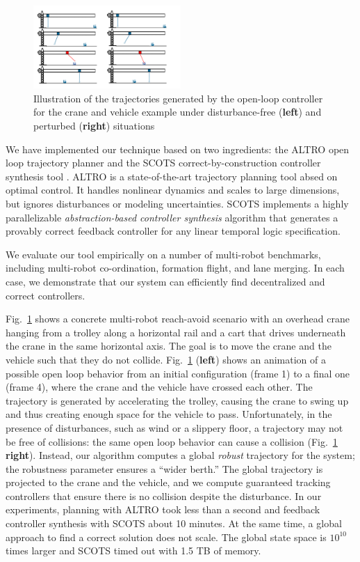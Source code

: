 \begin{figure}[t]
	\centering
	\includegraphics[width=0.5\textwidth]{figures/crane_and_forklifter.pdf}
	\caption{Illustration of the trajectories generated by the open-loop controller for the crane and vehicle example under disturbance-free (\textbf{left}) and perturbed (\textbf{right}) situations} 
	\label{fig:cr_and_lft}
\end{figure}




We have implemented our technique based on two ingredients: the ALTRO open loop trajectory planner \cite{howell2019altro} and the 
SCOTS correct-by-construction controller synthesis tool \cite{SCOTS}. 
ALTRO is a state-of-the-art trajectory planning tool absed on optimal control.
It handles nonlinear dynamics and scales to large dimensions, but ignores disturbances or modeling uncertainties.
SCOTS implements a highly parallelizable \emph{abstraction-based controller synthesis} algorithm that generates a provably
correct feedback controller for any linear temporal logic specification.

We evaluate our tool empirically on a number of multi-robot benchmarks, including multi-robot co-ordination,
formation flight, and lane merging.
In each case, we demonstrate that our system can efficiently find decentralized and correct controllers.

Fig.~\ref{fig:cr_and_lft} shows a concrete multi-robot reach-avoid scenario with an overhead crane hanging from a trolley along a horizontal rail
and a cart that drives underneath the crane in the same horizontal axis.
The goal is to move the crane and the vehicle such that they do not collide.
Fig.~\ref{fig:cr_and_lft} (\textbf{left}) shows an animation of a possible open loop behavior from an initial configuration (frame 1) to a final
one (frame 4), where the crane and the vehicle have crossed each other.
The trajectory is generated by accelerating the trolley, causing the crane to swing up and thus creating enough space for the vehicle to pass.
Unfortunately, in the presence of disturbances, such as wind or a slippery floor, a trajectory may not be free of collisions: the same open loop
behavior can cause a collision (Fig.~\ref{fig:cr_and_lft} \textbf{right}).
Instead, our algorithm computes a global \emph{robust} trajectory for the system; the robustness parameter ensures a ``wider berth.''
The global trajectory is projected to the crane and the vehicle, and we compute guaranteed tracking controllers that ensure there is no collision despite the disturbance.
In our experiments, planning with ALTRO took less than a second and feedback controller synthesis with SCOTS about 10 minutes.
At the same time, a global approach to find a correct solution does not scale. 
The global state space is $10^{10}$ times larger and SCOTS timed out with 1.5 TB of memory. 


